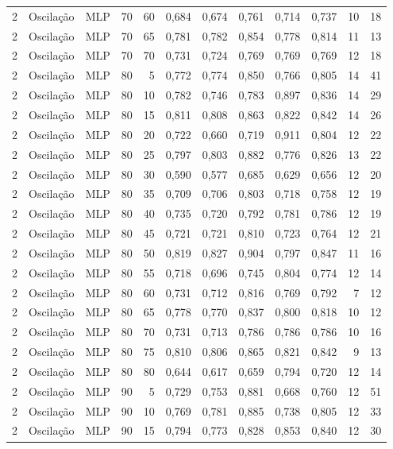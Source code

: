 \begin{longtable}{@{}rllrrrrrrrrr@{}}
2 & Oscilação & MLP & 70 & 60 & 0,684 & 0,674 & 0,761 & 0,714 & 0,737 & 10 & 18 \\
2 & Oscilação & MLP & 70 & 65 & 0,781 & 0,782 & 0,854 & 0,778 & 0,814 & 11 & 13 \\
2 & Oscilação & MLP & 70 & 70 & 0,731 & 0,724 & 0,769 & 0,769 & 0,769 & 12 & 18 \\
2 & Oscilação & MLP & 80 & 5 & 0,772 & 0,774 & 0,850 & 0,766 & 0,805 & 14 & 41 \\
2 & Oscilação & MLP & 80 & 10 & 0,782 & 0,746 & 0,783 & 0,897 & 0,836 & 14 & 29 \\
2 & Oscilação & MLP & 80 & 15 & 0,811 & 0,808 & 0,863 & 0,822 & 0,842 & 14 & 26 \\
2 & Oscilação & MLP & 80 & 20 & 0,722 & 0,660 & 0,719 & 0,911 & 0,804 & 12 & 22 \\
2 & Oscilação & MLP & 80 & 25 & 0,797 & 0,803 & 0,882 & 0,776 & 0,826 & 13 & 22 \\
2 & Oscilação & MLP & 80 & 30 & 0,590 & 0,577 & 0,685 & 0,629 & 0,656 & 12 & 20 \\
2 & Oscilação & MLP & 80 & 35 & 0,709 & 0,706 & 0,803 & 0,718 & 0,758 & 12 & 19 \\
2 & Oscilação & MLP & 80 & 40 & 0,735 & 0,720 & 0,792 & 0,781 & 0,786 & 12 & 19 \\
2 & Oscilação & MLP & 80 & 45 & 0,721 & 0,721 & 0,810 & 0,723 & 0,764 & 12 & 21 \\
2 & Oscilação & MLP & 80 & 50 & 0,819 & 0,827 & 0,904 & 0,797 & 0,847 & 11 & 16 \\
2 & Oscilação & MLP & 80 & 55 & 0,718 & 0,696 & 0,745 & 0,804 & 0,774 & 12 & 14 \\
2 & Oscilação & MLP & 80 & 60 & 0,731 & 0,712 & 0,816 & 0,769 & 0,792 & 7 & 12 \\
2 & Oscilação & MLP & 80 & 65 & 0,778 & 0,770 & 0,837 & 0,800 & 0,818 & 10 & 12 \\
2 & Oscilação & MLP & 80 & 70 & 0,731 & 0,713 & 0,786 & 0,786 & 0,786 & 10 & 16 \\
2 & Oscilação & MLP & 80 & 75 & 0,810 & 0,806 & 0,865 & 0,821 & 0,842 & 9 & 13 \\
2 & Oscilação & MLP & 80 & 80 & 0,644 & 0,617 & 0,659 & 0,794 & 0,720 & 12 & 14 \\
2 & Oscilação & MLP & 90 & 5 & 0,729 & 0,753 & 0,881 & 0,668 & 0,760 & 12 & 51 \\
2 & Oscilação & MLP & 90 & 10 & 0,769 & 0,781 & 0,885 & 0,738 & 0,805 & 12 & 33 \\
2 & Oscilação & MLP & 90 & 15 & 0,794 & 0,773 & 0,828 & 0,853 & 0,840 & 12 & 30 \\

\end{longtable}
